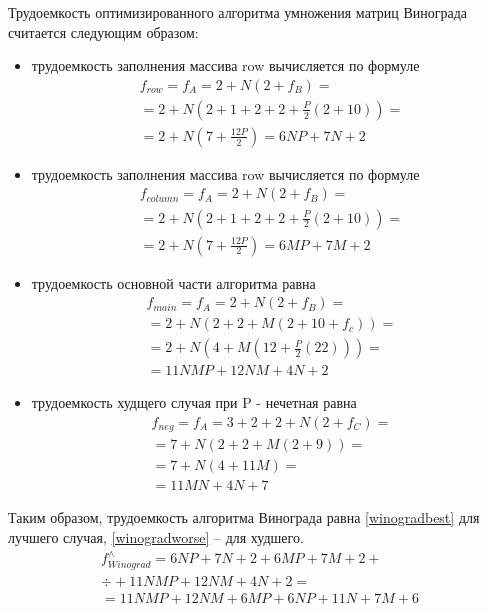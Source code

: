 Трудоемкость оптимизированного алгоритма умножения матриц Винограда считается следующим образом:

\begin{itemize}[left=\parindent]
    \item трудоемкость заполнения массива row вычисляется по формуле
        \begin{multline}\label{mulHeq}
            f_{row} = f_A = 2 + N(2 + f_B) = \\ = 2 + N(2 +
                       1 + 2 + 2 + \frac{P}{2}(2 + 10)) = \\ = 2 +
                       N(7 + \frac{12P}{2}) = 6NP + 7N + 2
        \end{multline}

        \item трудоемкость заполнения массива row вычисляется по формуле
        \begin{multline}\label{mulHeq}
            f_{column} = f_A = 2 + N(2 + f_B) = \\ = 2 + N(2 +
                       1 + 2 + 2 + \frac{P}{2}(2 + 10)) = \\ = 2 +
                       N(7 + \frac{12P}{2}) = 6MP + 7M + 2
        \end{multline}
    
    \item трудоемкость основной части алгоритма равна
        \begin{multline}\label{winmainbesteq}
            f_{main} = f_A = 2 + N(2 + f_B) = \\ =  2 + N(2 + 2 + M(2
            + 10 + f_c)) = \\ = 2 + N(4 + M(12 + \frac{P}{2}(22))) =
            \\ = 11NMP + 12NM + 4N + 2
        \end{multline}

    \clearpage
    \item трудоемкость худщего случая при P - нечетная равна
        \begin{multline}\label{winmainworseeq}
            f_{neg} = f_A = 3 + 2 + 2 + N(2 + f_C) = \\ =  7 + N(2 + 2 + M(2 +
            9)) = \\ = 7 + N(4 + 11M) = \\ = 11MN + 4N + 7
        \end{multline}
\end{itemize}

Таким образом, трудоемкость алгоритма Винограда равна \ref{winogradbest} для
лучшего случая, \ref{winogradworse} -- для худшего.
\begin{multline}\label{winogradbest}
    f_{Winograd}^{\wedge} = 6NP + 7N + 2 + 6MP + 7M + 2 + \\
                            ÷+ 11NMP + 12NM + 4N + 2 = \\
                            = 11NMP + 12NM + 6MP + 6NP + 11N + 7M + 6
\end{multline}


